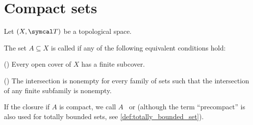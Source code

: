 \section{Compact sets}\label{sec:compact_sets}

Let \( (X, \Cal{T}) \) be a topological space.

\begin{definition}\label{def:compact_set}\cite[40]{Deimling1985}
  The set \( A \subseteq X \) is called  if any of the following equivalent conditions hold:
  \begin{defenum}
    \item\label{def:compact_set/union} () Every open cover of \( X \) has a finite subcover.
    \item\label{def:compact_set/intersection} () The intersection is nonempty for every family of sets such that the intersection of any finite subfamily is nonempty.
  \end{defenum}

  If the closure if \( A \) is compact, we call \( A \)~ or  (although the term \enquote{precompact} is also used for totally bounded sets, see \ref{def:totally_bounded_set}).
\end{definition}
